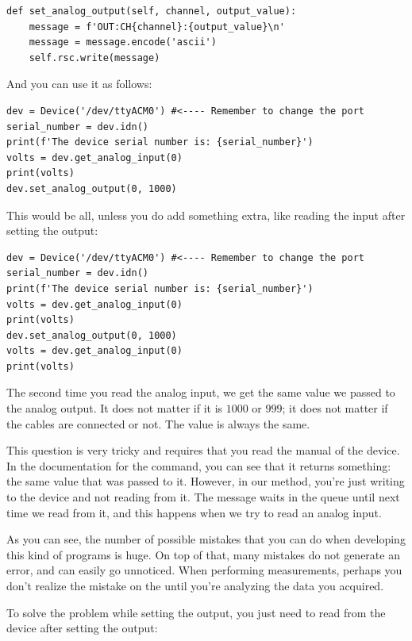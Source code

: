\begin{verbatim}
def set_analog_output(self, channel, output_value):
    message = f'OUT:CH{channel}:{output_value}\n'
    message = message.encode('ascii')
    self.rsc.write(message)
\end{verbatim}

And you can use it as follows:

\begin{verbatim}
dev = Device('/dev/ttyACM0') #<---- Remember to change the port
serial_number = dev.idn()
print(f'The device serial number is: {serial_number}')
volts = dev.get_analog_input(0)
print(volts)
dev.set_analog_output(0, 1000)
\end{verbatim}

This would be all, unless you do add something extra, like reading the input after setting the output:

\begin{verbatim}
dev = Device('/dev/ttyACM0') #<---- Remember to change the port
serial_number = dev.idn()
print(f'The device serial number is: {serial_number}')
volts = dev.get_analog_input(0)
print(volts)
dev.set_analog_output(0, 1000)
volts = dev.get_analog_input(0)
print(volts)
\end{verbatim}

The second time you read the analog input, we get the same value we passed to the analog output. It does not matter if it is $1000$ or $999$; it does not matter if the cables are connected or not. The value is always the same.


This question is very tricky and requires that you read the manual of the device. In the documentation for the  command, you can see that it returns something: the same value that was passed to it. However, in our method, you're just writing to the device and not reading from it. The message waits in the queue until next time we read from it, and this happens when we try to read an analog input.

As you can see, the number of possible mistakes that you can do when developing this kind of programs is huge. On top of that, many mistakes do not generate an error, and can easily go unnoticed. When performing measurements, perhaps you don't realize the mistake on the  until you're analyzing the data you acquired.

To solve the problem while setting the output, you just need to read from the device after setting the output:

